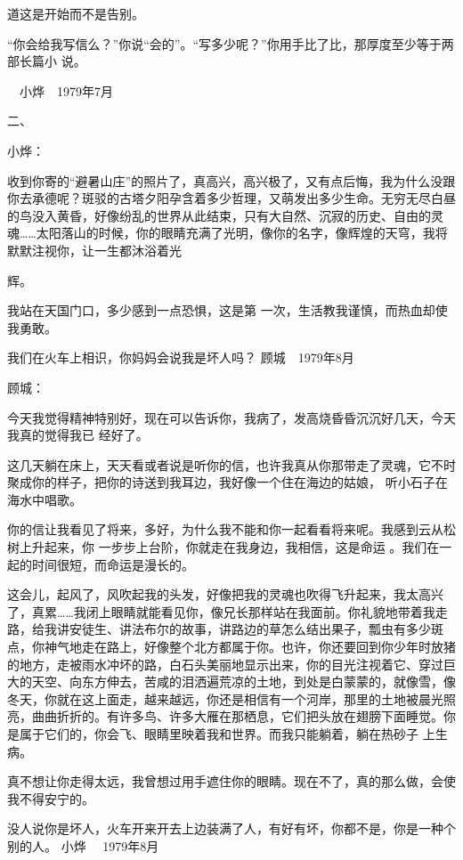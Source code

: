 \documentclass{article}
\begin{document}
道这是开始而不是告别。 

“你会给我写信么？”你说“会的”。“写多少呢？”你用手比了比，那厚度至少等于两部长篇小
说。 


　小烨　1979年7月 


二、 



小烨： 

收到你寄的“避暑山庄”的照片了，真高兴，高兴极了，又有点后悔，我为什么没跟你去承德呢？斑驳的古塔夕阳孕含着多少哲理，又萌发出多少生命。无穷无尽白昼的鸟没入黄昏，好像纷乱的世界从此结束，只有大自然、沉寂的历史、自由的灵魂……太阳落山的时候，你的眼睛充满了光明，像你的名字，像辉煌的天穹，我将默默注视你，让一生都沐浴着光

\newpage
辉。 

我站在天国门口，多少感到一点恐惧，这是第
一次，生活教我谨慎，而热血却使我勇敢。 

我们在火车上相识，你妈妈会说我是坏人吗？
 顾城　1979年8月 



顾城： 

今天我觉得精神特别好，现在可以告诉你，我病了，发高烧昏昏沉沉好几天，今天我真的觉得我已
经好了。 

这几天躺在床上，天天看或者说是听你的信，也许我真从你那带走了灵魂，它不时聚成你的样子，把你的诗送到我耳边，我好像一个住在海边的姑娘，
听小石子在海水中唱歌。 

你的信让我看见了将来，多好，为什么我不能和你一起看看将来呢。我感到云从松树上升起来，你
\newpage
一步步上台阶，你就走在我身边，我相信，这是命运
。我们在一起的时间很短，而命运是漫长的。 

这会儿，起风了，风吹起我的头发，好像把我的灵魂也吹得飞升起来，我太高兴了，真累……我闭上眼睛就能看见你，像兄长那样站在我面前。你礼貌地带着我走路，给我讲安徒生、讲法布尔的故事，讲路边的草怎么结出果子，瓢虫有多少斑点，你神气地走在路上，好像整个北方都属于你。也许，你还要回到你少年时放猪的地方，走被雨水冲坏的路，白石头美丽地显示出来，你的目光注视着它、穿过巨大的天空、向东方伸去，苦咸的泪洒遍荒凉的土地，到处是白蒙蒙的，就像雪，像冬天，你就在这上面走，越来越远，你还是相信有一个河岸，那里的土地被晨光照亮，曲曲折折的。有许多鸟、许多大雁在那栖息，它们把头放在翅膀下面睡觉。你是属于它们的，你会飞、眼睛里映着我和世界。而我只能躺着，躺在热砂子
上生病。 

真不想让你走得太远，我曾想过用手遮住你的眼睛。现在不了，真的那么做，会使我不得安宁的。
\newpage

 

没人说你是坏人，火车开来开去上边装满了人，有好有坏，你都不是，你是一种个别的人。 小烨
　1979年8月 
\end{document}
